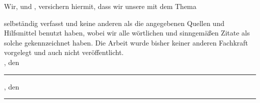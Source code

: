 \clearpage
{}


Wir, \autorNameTwo{} und \autorNameOne{}, versichern hiermit, dass wir unsere \textbf{\betreff} mit dem
Thema
\begin{quote}
\textit{\kompletterTitel}
\end{quote}
selbständig verfasst und keine anderen als die angegebenen Quellen und Hilfsmittel benutzt haben,
wobei wir alle wörtlichen und sinngemäßen Zitate als solche gekennzeichnet haben. Die Arbeit
wurde bisher keiner anderen Fachkraft vorgelegt und auch nicht veröffentlicht.\\[6ex]




\abgabeOrt, den \abgabeTermin


\rule[-0.2cm]{4cm}{0.5pt}

\textsc{\autorNameOne}






\abgabeOrt, den \abgabeTermin


\rule[-0.2cm]{4cm}{0.5pt}

\textsc{\autorNameTwo}
